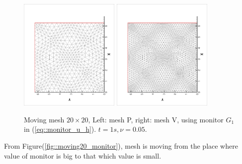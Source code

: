 \documentclass{article}
\begin{document}
 \begin{figure}[ht]
   \centering
   \includegraphics[width = 0.43\textwidth, angle = -90]{./moving20_meshP.eps}
   \includegraphics[width = 0.43\textwidth, angle = -90]{./moving20_meshV.eps}
   \caption{\small Moving mesh $20 \times 20$,
     Left: mesh P, right: mesh V, using monitor $G_1$
     in (\ref{eq::monitor_u_h}). $t = 1s, \nu = 0.05$.}
   \label{fig::moving20_mesh}
 \end{figure}

 From Figure(\ref{fig::moving20_monitor}), mesh is moving from the
 place where value of monitor is big to that which value is small.
 
\end{document}
